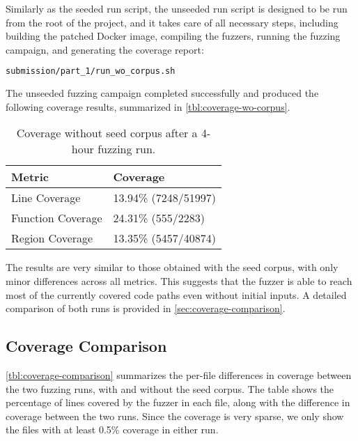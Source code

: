 Similarly as the seeded run script, the unseeded run script is designed to be run from the root of the project, and it takes care of all necessary steps, including building the patched Docker image, compiling the fuzzers, running the fuzzing campaign, and generating the coverage report:

\begin{lstlisting}[language=bash, caption=Bash command to run an automated fuzzing campaign without seed corpus]
submission/part_1/run_wo_corpus.sh
\end{lstlisting}

The unseeded fuzzing campaign completed successfully and produced the following coverage results, summarized in \autoref{tbl:coverage-wo-corpus}.

\begin{table}[ht]
	\centering
	\begin{tabular}{@{}ll@{}}
		\toprule
		\textbf{Metric}   & \textbf{Coverage}    \\
		\midrule
		Line Coverage     & 13.94\% (7248/51997) \\
		Function Coverage & 24.31\% (555/2283)   \\
		Region Coverage   & 13.35\% (5457/40874) \\
		\bottomrule
	\end{tabular}
	\caption{Coverage without seed corpus after a 4-hour fuzzing run.}
	\label{tbl:coverage-wo-corpus}
\end{table}

The results are very similar to those obtained with the seed corpus, with only minor differences across all metrics. This suggests that the fuzzer is able to reach most of the currently covered code paths even without initial inputs. A detailed comparison of both runs is provided in \autoref{sec:coverage-comparison}.

\subsection{Coverage Comparison}
\label{sec:coverage-comparison}

\autoref{tbl:coverage-comparison} summarizes the per-file differences in coverage between the two fuzzing runs, with and without the seed corpus. The table shows the percentage of lines covered by the fuzzer in each file, along with the difference in coverage between the two runs. Since the coverage is very sparse, we only show the files with at least 0.5\% coverage in either run.

